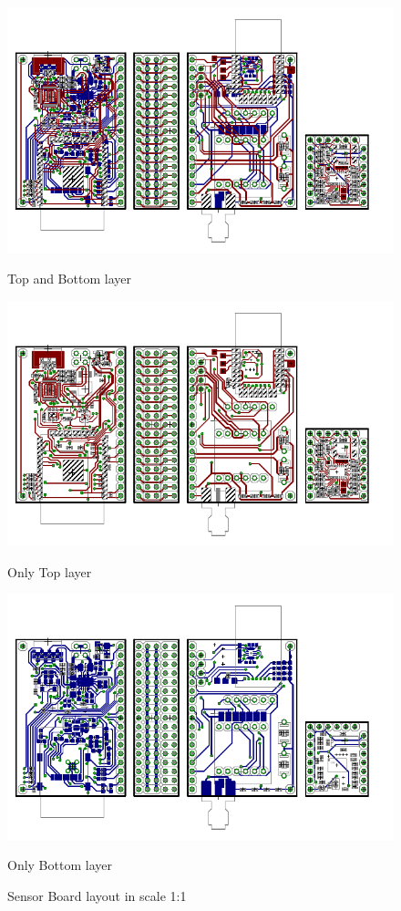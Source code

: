 \begin{figure}
	\centering
	\includegraphics[scale=1]{img/brd.pdf}
	\begin{center}
		Top and Bottom layer
	\end{center}
	\includegraphics[scale=1]{img/brdTop.pdf}
	\begin{center}
		Only Top layer
	\end{center}
	\includegraphics[scale=1]{img/brdBottom.pdf}
	\begin{center}
		Only Bottom layer
	\end{center}
	\label{brd1}
	\caption{Sensor Board layout in scale 1:1}
\end{figure}

